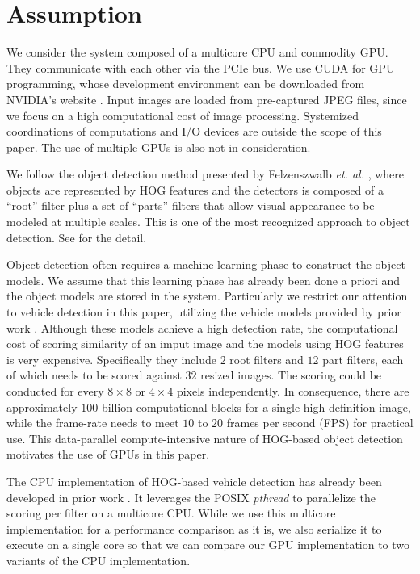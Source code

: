 \section{Assumption}
\label{sec:assumption}

We consider the system composed of a multicore CPU and commodity GPU.
They communicate with each other via the PCIe bus.
We use CUDA \cite{NVIDIA_CUDA} for GPU programming, whose development
environment can be downloaded from NVIDIA's website \cite{NVIDIA_NVCC}.
Input images are loaded from pre-captured JPEG files, since we focus on
a high computational cost of image processing.
Systemized coordinations of computations and I/O devices are outside the
scope of this paper.
The use of multiple GPUs is also not in consideration.

We follow the object detection method presented by Felzenszwalb
\textit{et. al.} \cite{Felzenszwalb10}, where objects are represented by
HOG features \cite{Dalal05} and the detectors is composed of a ``root''
filter plus a set of ``parts'' filters that allow visual appearance to
be modeled at multiple scales.
This is one of the most recognized approach to object detection.
See \cite{Felzenszwalb10} for the detail.

Object detection often requires a machine learning phase to construct
the object models.
We assume that this learning phase has already been done a priori and
the object models are stored in the system.
Particularly we restrict our attention to vehicle detection in this
paper, utilizing the vehicle models provided by prior work
\cite{Niknejad12}.
Although these models achieve a high detection rate, the computational
cost of scoring similarity of an imput image and the models using HOG
features is very expensive.
Specifically they include $2$ root filters and $12$ part filters, each
of which needs to be scored against $32$ resized images.
The scoring could be conducted for every $8 \times 8$ or $4 \times 4$
pixels independently.
In consequence, there are approximately $100$ billion computational
blocks for a single high-definition image, while the frame-rate needs to
meet $10$ to $20$ frames per second (FPS) for practical use.
This data-parallel compute-intensive nature of HOG-based object
detection motivates the use of GPUs in this paper.

The CPU implementation of HOG-based vehicle detection has already been
developed in prior work \cite{Niknejad12}.
It leverages the POSIX \textit{pthread} to parallelize the scoring per
filter on a multicore CPU.
While we use this multicore implementation for a performance comparison
as it is, we also serialize it to execute on a single core so that we
can compare our GPU implementation to two variants of the CPU
implementation.
